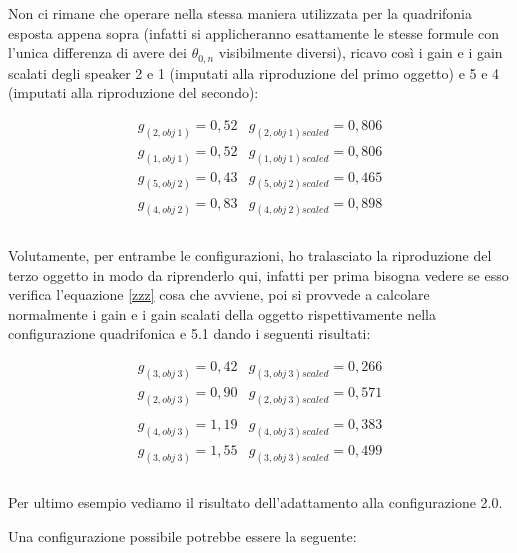 \documentclass[12pt,a4paper]{report}
\begin{document}
\begin{itemize}
Non ci rimane che operare nella stessa maniera utilizzata per la quadrifonia esposta appena sopra (infatti si applicheranno esattamente le stesse formule con l'unica differenza di avere dei $\theta_{0,n}$ visibilmente diversi), ricavo così i gain e i gain scalati degli speaker 2 e 1 (imputati alla riproduzione del primo oggetto) e 5 e 4 (imputati alla riproduzione del secondo):

\begin{equation}
\begin{matrix}
g_{(2,obj\ 1)} = 0,52 & g_{(2,obj\ 1)scaled} = 0,806\\
g_{(1,obj\ 1)} = 0,52 & g_{(1,obj\ 1)scaled} = 0,806\\
g_{(5,obj\ 2)} = 0,43 & g_{(5,obj\ 2)scaled} = 0,465\\
g_{(4,obj\ 2)} = 0,83 & g_{(4,obj\ 2)scaled} = 0,898  \\

\end{matrix}
\label{gscalatiesempio2}
\end{equation} \\


Volutamente, per entrambe le configurazioni, ho tralasciato la riproduzione del terzo oggetto in modo da riprenderlo qui, infatti per prima bisogna vedere se esso verifica l'equazione \ref{zzz} cosa che avviene, poi si provvede a calcolare normalmente i gain e i gain scalati della oggetto rispettivamente nella configurazione quadrifonica e 5.1 dando i seguenti risultati:

\begin{equation}
\begin{matrix}
g_{(3,obj\ 3)} = 0,42 & g_{(3,obj\ 3)scaled} = 0,266\\
g_{(2,obj\ 3)} = 0,90 & g_{(2,obj\ 3)scaled} = 0,571\\
\\
g_{(4,obj\ 3)} = 1,19 & g_{(4,obj\ 3)scaled} = 0,383\\
g_{(3,obj\ 3)} = 1,55 & g_{(3,obj\ 3)scaled} = 0,499\\

\end{matrix}
\label{gscalatiesempiooggetto3}
\end{equation} \\



Per ultimo esempio vediamo il risultato dell'adattamento alla configurazione 2.0.

Una configurazione possibile potrebbe essere la seguente:


\end{itemize}
\end{document}
